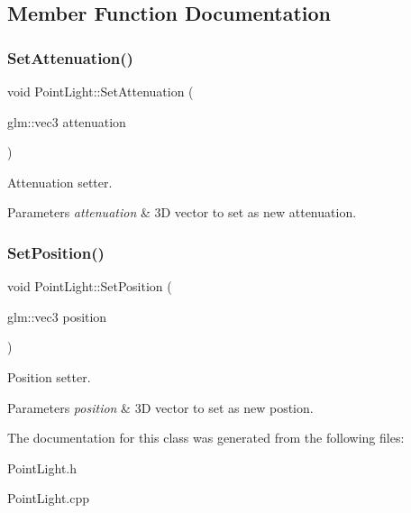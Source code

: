 \subsection{Member Function Documentation}
\mbox{\label{class_point_light_a5dee3d9dfd33530fd0b5c4e3caa733a5}} 
\subsubsection{\texorpdfstring{Set\+Attenuation()}{SetAttenuation()}}
{\footnotesize\ttfamily void Point\+Light\+::\+Set\+Attenuation (\begin{DoxyParamCaption}\item[{glm\+::vec3}]{attenuation }\end{DoxyParamCaption})}



Attenuation setter. 


\begin{DoxyParams}{Parameters}
{\em attenuation} & 3D vector to set as new attenuation. \\
\hline
\end{DoxyParams}
\mbox{\label{class_point_light_a54075ad125124b48c3ae0de94f8846ec}} 
\subsubsection{\texorpdfstring{Set\+Position()}{SetPosition()}}
{\footnotesize\ttfamily void Point\+Light\+::\+Set\+Position (\begin{DoxyParamCaption}\item[{glm\+::vec3}]{position }\end{DoxyParamCaption})}



Position setter. 


\begin{DoxyParams}{Parameters}
{\em position} & 3D vector to set as new postion. \\
\hline
\end{DoxyParams}


The documentation for this class was generated from the following files\+:\begin{DoxyCompactItemize}
\item 
Point\+Light.\+h\item 
Point\+Light.\+cpp\end{DoxyCompactItemize}
